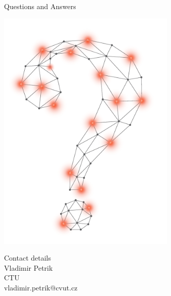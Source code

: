 \documentclass{agimusslidesreview}
\begin{document}

    \begin{frame}{Questions and Answers}
        \begin{minipage}[t]{0.5\textwidth}
            \vspace{0pt}
            \includegraphics[width=0.5\linewidth]{figs_review/question_mark}
        \end{minipage}%
        \begin{minipage}[t]{0.5\textwidth}
            \vspace{0pt}
            \flushright
            \vspace{2cm}
            \alert{\large Contact details} \\[\agimustitlesep]
            Vladimir Petrik \\
            CTU \\
            vladimir.petrik@cvut.cz
        \end{minipage}
    \end{frame}
\end{document}
